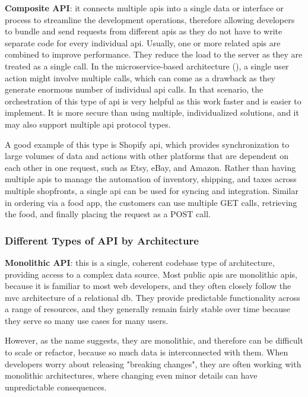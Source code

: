 \begin{multicols}{2}


\textbf{Composite API}: it connects multiple \acrshort{api}s into a single data or interface or process to
streamline the development operations, therefore allowing developers to bundle and send requests from different
\acrshort{api}s as they do not have to write separate code for every individual \acrshort{api}. Usually,
one or more related \acrshort{api}s are combined to improve performance. They reduce the load to the server
as they are treated as a single call. In the microservice-based architecture
(\textit{}), a single user action might involve multiple calls, which can come as
a drawback as they generate enormous number of individual \acrshort{api} calls. In that scenario, the orchestration
of this type of \acrshort{api} is very helpful as this work faster and is easier to implement. It is more secure
than using multiple, individualized solutions, and it may also support multiple \acrshort{api} protocol types.

A good example of this type is Shopify \acrshort{api}, which provides synchronization to large volumes of data and
actions with other platforms that are dependent on each other in one request, such as Etsy, eBay, and Amazon. Rather
than having multiple \acrshort{api}s to manage the automation of inventory, shipping, and taxes across multiple shopfronts,
a single \acrshort{api} can be used for syncing and integration. Similar in ordering via a food app, the customers can
use multiple GET calls, retrieving the food, and finally placing the request as a POST call.
\subsubsection{Different Types of API by Architecture}
\textbf{Monolithic API}: this is a single, coherent codebase type of architecture, providing access to a complex data
source. Most public \acrshort{api}s are monolithic \acrshort{api}s, because it is familiar to most web developers, and
they often closely follow the \acrshort{mvc} architecture of a relational \acrshort{db}. They provide predictable
functionality across a range of resources, and they generally remain fairly stable over time because they serve so
many use cases for many users.

However, as the name suggests, they are monolithic, and therefore can be difficult to scale or refactor, because so much
data is interconnected with them. When developers worry about releasing "breaking changes", they are often working with
monolithic architectures, where changing even minor details can have unpredictable consequences.


\end{multicols}
